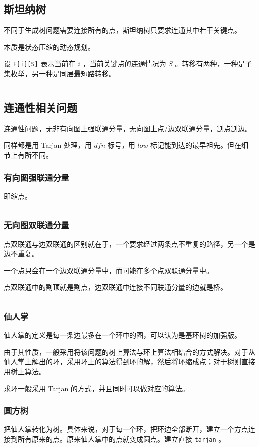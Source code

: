 \documentclass[UTF-8]{ctexart}
\newcommand{\cpp}[1]{\inputminted[bgcolor=bg,breaklines,breakanywhere=true]{c++}{#1}}
\begin{document}
			\subsection{斯坦纳树}
			不同于生成树问题需要连接所有的点，斯坦纳树只要求连通其中若干关键点。
			
			本质是状态压缩的动态规划。
			
			设 \texttt{F[i][S]} 表示当前在 $i$ ，当前关键点的连通情况为 $S$ 。转移有两种，一种是子集枚举，另一种是同层最短路转移。
			
			\cpp{code//Graph//smt.cpp}
			\subsection{连通性相关问题}
			连通性问题，无非有向图上强联通分量，无向图上点/边双联通分量，割点割边。
			
			同样都是用 Tarjan 处理，用 $dfn$ 标号，用 $low$ 标记能到达的最早祖先。但在细节上有所不同。
				\subsubsection{有向图强联通分量}
				即缩点。
				\cpp{code//Graph//tarjan-direct.cpp}
				\subsubsection{无向图双联通分量}
				点双联通与边双联通的区别就在于，一个要求经过两条点不重复的路径，另一个是边不重复。
				
				一个点只会在一个边双联通分量中，而可能在多个点双联通分量中。
				
				点双联通中的割顶就是割点，边双联通中连接不同联通分量的边就是桥。
				\cpp{code//Graph//tarjan-undirect.cpp}
				\subsubsection{仙人掌}
				仙人掌的定义是每一条边最多在一个环中的图，可以认为是基环树的加强版。
				
				由于其性质，一般采用将该问题的树上算法与环上算法相结合的方式解决。对于从仙人掌上解出的环，采用环上的算法得到环的解，然后将环缩成点；对于树则直接用树上算法。
				
				求环一般采用 Tarjan 的方式，并且同时可以做对应的算法。
				\subsubsection{圆方树}
				把仙人掌转化为树。具体来说，对于每一个环，把环边全部断开，建立一个方点连接到所有原来的点。原来仙人掌中的点就变成圆点。建立直接 \texttt{tarjan} 。
				
\end{document}
